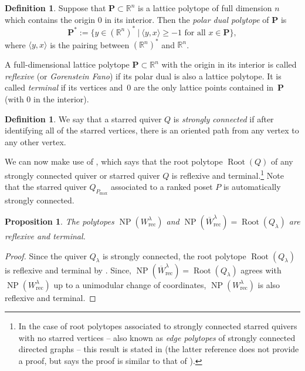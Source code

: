 \documentclass{amsart}
\newtheorem{prop}[thm]{Proposition}
\theoremstyle{definition}
\newtheorem{definition}[thm]{Definition}
\numberwithin{equation}{section}
\newcommand{\R}{\mathbb R}
\newcommand{\rect}{\mathrm{rec}}
\newcommand{\NP}{\operatorname{NP}}
\newcommand{\Root}{\operatorname{Root}}
\newcommand{\rW}{\overline{W}}
\newcommand{\Poly}{\mathbf{P}}
\begin{document}
\begin{definition}\label{def:reflexive}
Suppose that $\Poly\subset \R^n$ is a lattice polytope of full dimension $n$
which contains the origin $0$ in its interior. Then
the \emph{polar dual polytope} of $\Poly$ is
$$\Poly^*:= \{y \in (\R^n)^* \ \vert \ \langle y,x \rangle \geq -1
  \text{ for all }x\in \Poly\},$$
where $\langle y,x \rangle$ is the pairing between 
	$(\R^n)^*$ and $\R^n$.

	A full-dimensional lattice polytope $\Poly\subset \R^n$ with the origin in its interior is called \emph{reflexive} (or \emph{Gorenstein Fano}) if 
its polar dual is also a lattice polytope.
It is called \textit{terminal} if its vertices and~$0$ are the only  lattice points contained in~$\Poly$ (with $0$ in the interior). 
\end{definition}


\begin{definition}\label{d:strongconn}
We say that a starred quiver $Q$ is \emph{strongly connected} if after identifying all of the starred vertices, there is an oriented path from any vertex to any other vertex.
\end{definition}

We can now make use of \cite[Theorem A]{RWReflexive}, which says that the root polytope $\Root(Q)$ of any strongly connected  quiver or starred quiver $Q$  
is reflexive and terminal.\footnote{In the case of 
root polytopes associated to strongly connected 
starred quivers with no starred vertices -- 
also known as \emph{edge polytopes}
of strongly connected directed graphs -- this result
is stated in \cite[Proposition 1.4]{Higashitani}
(the latter reference does not provide a proof,
but says the proof is similar to that of 
  \cite[Proposition 3.2]{Matsui}).} Note that the starred quiver $Q_{P_{\max}}$ associated to a ranked poset $P$ is automatically strongly connected. 
\begin{prop}\label{c:reflexiveterminal}
 The polytopes  $\NP(W_{\rect}^{\lambda})$ and 
$\NP(\rW_{\rect}^{\lambda})=\Root(Q_\lambda)$  
  are reflexive and terminal.  
\end{prop}
\begin{proof}
Since the quiver $Q_\lambda$ is strongly connected, the root polytope $\Root(Q_\lambda)$   
is reflexive and terminal by \cite[Theorem A]{RWReflexive}.  
Since, $\NP(\rW_{\rect}^{\lambda})=\Root(Q_\lambda)$ agrees with $\NP(W_{\rect}^{\lambda})$ up to a unimodular change of coordinates, $\NP(W_{\rect}^{\lambda})$ is also reflexive and terminal.   
\end{proof}
\end{document}
